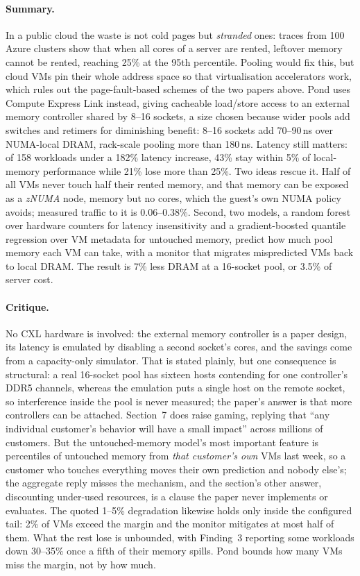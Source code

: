 \paragraph{Summary.}
In a public cloud the waste is not cold pages but \emph{stranded} ones: traces from 100
Azure clusters show that when all cores of a server are rented, leftover memory cannot
be rented, reaching 25\% at the 95th percentile. Pooling would fix this, but
cloud VMs pin their whole address space so that virtualisation accelerators work, which
rules out the page-fault-based schemes of the two papers above. Pond uses Compute
Express Link instead, giving cacheable load/store access to an external memory
controller shared by 8--16 sockets, a size chosen because wider pools add switches
and retimers for diminishing benefit: 8--16 sockets add 70--90\,ns over
NUMA-local DRAM, rack-scale pooling more than 180\,ns. Latency still matters: of 158
workloads under a 182\% latency increase, 43\% stay within 5\% of local-memory
performance while 21\% lose more than 25\%. Two ideas rescue it.
Half of all VMs never touch half their rented memory, and that memory can be exposed as
a \emph{zNUMA} node, memory but no cores, which the guest's own NUMA policy
avoids; measured traffic to it is 0.06--0.38\%. Second, two models, a random forest over
hardware counters for latency insensitivity and a gradient-boosted quantile regression
over VM metadata for untouched memory, predict how much pool memory each VM can take,
with a monitor that migrates mispredicted VMs back to local DRAM. The result is 7\%
less DRAM at a 16-socket pool, or 3.5\% of server cost.

\paragraph{Critique.}
No CXL hardware is involved: the external memory controller is a paper design, its
latency is emulated by disabling a second socket's cores, and the savings come from a
capacity-only simulator. That is stated plainly, but one consequence is structural: a
real 16-socket pool has sixteen hosts contending for one controller's DDR5 channels,
whereas the emulation puts a single host on the remote socket, so interference inside the
pool is never measured; the paper's answer is that more controllers can be attached.
Section~7 does raise gaming, replying that ``any individual customer's behavior will have
a small impact'' across millions of customers. But the untouched-memory model's most
important feature is percentiles of untouched memory from \emph{that customer's own} VMs
last week, so a customer who touches everything moves their own prediction and nobody
else's; the aggregate reply misses the mechanism, and the section's other answer,
discounting under-used resources, is a clause the paper never implements or evaluates.
The quoted 1--5\% degradation likewise holds only inside the configured tail: 2\% of VMs
exceed the margin and the monitor mitigates at most half of them. What the rest lose is
unbounded, with Finding~3 reporting some workloads down 30--35\% once a fifth of their
memory spills. Pond bounds how many VMs miss the margin, not by how much.
